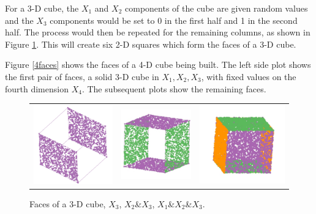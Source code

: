 For a 3-D cube, the $X_1$ and $X_2$ components of the cube are given
random values and the $X_3$ components would be set to 0 in the first
half and 1 in the second half. The process would then be repeated for
the remaining columns, as shown in Figure \ref{faces}. This will
create six 2-D squares which form the faces of a 3-D cube.

Figure \ref{4faces} shows the faces of a 4-D cube being built. The
left side plot shows the first pair of faces, a solid 3-D cube in
$X_1, X_2, X_3$, with fixed values on the fourth dimension $X_4$. The
subsequent plots show the remaining faces.

\begin{figure}[ht]
  \centering
  \begin{tabular}{c c c}
    \includegraphics[width=.9in]{fig/cube-x.pdf} &
    \includegraphics[width=.9in]{fig/cube-x-y.pdf} &
    \includegraphics[width=.9in]{fig/cube-x-y-z.pdf}
  \end{tabular}

  \caption{Faces of a 3-D cube, $X_3$, $X_2$\&$X_3$,
      $X_1$\&$X_2$\&$X_3$.}
  \label{faces}
\end{figure}

